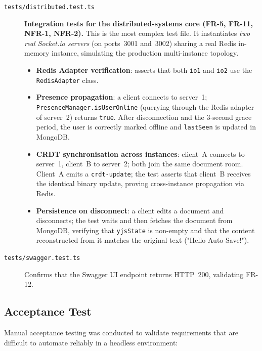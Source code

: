 \documentclass{scrartcl}
\begin{document}
\begin{description}
    \item[\texttt{tests/distributed.test.ts}]
    \textbf{Integration tests for the distributed-systems core (FR-5, FR-11, NFR-1, NFR-2).}
    This is the most complex test file. It instantiates \emph{two real Socket.io servers}
    (on ports~3001 and~3002) sharing a real Redis in-memory instance, simulating the
    production multi-instance topology.
    \begin{itemize}
      \item \textbf{Redis Adapter verification}: asserts that both \texttt{io1} and \texttt{io2}
      use the \texttt{RedisAdapter} class.
      \item \textbf{Presence propagation}: a client connects to server~1;
      \texttt{PresenceManager.isUserOnline} (querying through the Redis adapter of server~2)
      returns \texttt{true}. After disconnection and the 3-second grace period, the user is
      correctly marked offline and \texttt{lastSeen} is updated in MongoDB.
      \item \textbf{CRDT synchronisation across instances}: client~A connects to server~1,
      client~B to server~2; both join the same document room. Client~A emits a
      \texttt{crdt-update}; the test asserts that client~B receives the identical binary update,
      proving cross-instance propagation via Redis.
      \item \textbf{Persistence on disconnect}: a client edits a document and disconnects; the
      test waits and then fetches the document from MongoDB, verifying that \texttt{yjsState}
      is non-empty and that the content reconstructed from it matches the original text
      ("Hello Auto-Save!").
    \end{itemize}

    \item[\texttt{tests/swagger.test.ts}] Confirms that the Swagger UI endpoint returns
    HTTP~200, validating FR-12.
  \end{description}

  \subsection{Acceptance Test}\label{acceptance-test}

  Manual acceptance testing was conducted to validate requirements that are difficult to
  automate reliably in a headless environment:
\end{document}
